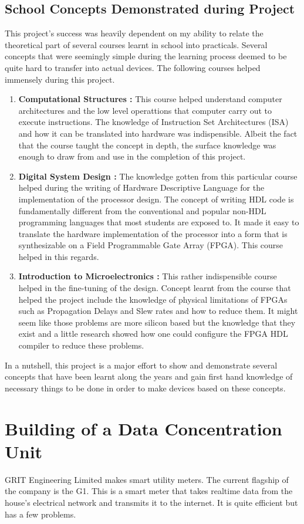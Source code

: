 \subsection{School Concepts Demonstrated during Project}
This project's success was heavily dependent on my ability to relate the theoretical part of several courses learnt in school into practicals. Several concepts that were seemingly simple during the learning process deemed to be quite hard to transfer into actual devices. The following courses helped immensely during this project.
\begin{enumerate}
\item \textbf{Computational Structures :} This course helped understand computer architectures and the low level operattions that computer carry out to execute instructions. The knowledge of Instruction Set Architectures (ISA) and how it can be translated into hardware was indispensible. Albeit the fact that the course taught the concept in depth, the surface knowledge was enough to draw from and use in the completion of this project.
\item \textbf{Digital System Design :} The knowledge gotten from this particular course helped during the writing of Hardware Descriptive Language for the implementation of the processor design. The concept of writing HDL code is fundamentally different from the conventional and popular non-HDL programming languages that most students are exposed to. It made it easy to translate the hardware implementation of the processor into a form that is synthesizable on a Field Programmable Gate Array (FPGA). This course helped in this regards.
\item \textbf{Introduction to Microelectronics :} This rather indispensible course helped in the fine-tuning of the design. Concept learnt from the course that helped the project include the knowledge of physical limitations of FPGAs such as Propagation Delays and Slew rates and how to reduce them. It might seem like those problems are more silicon based but the knowledge that they exist and a little research showed how one could configure the FPGA HDL compiler to reduce these problems.
\end{enumerate}
In a nutshell, this project is a major effort to show and demonstrate several concepts that have been learnt along the years and gain first hand knowledge of necessary things to be done in order to make devices based on these concepts.



\section{Building of a Data Concentration Unit}
GRIT Engineering Limited makes smart utility meters. The current flagship of the company is the G1. This is a smart meter that takes realtime data from the house's electrical network and transmits it to the internet. It is quite efficient but has a few problems. 

